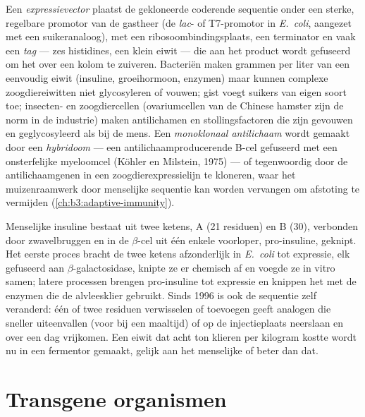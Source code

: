 \begin{definition}[Expressiesystemen]\label{def:b3:genetic-engineering:expression}
Een \emph{expressievector} plaatst de gekloneerde coderende sequentie
onder een sterke, regelbare promotor van de gastheer (de \emph{lac}- of
T7-promotor in \emph{E.~coli}, aangezet met een suikeranaloog), met een
ribosoombindingsplaats, een terminator en vaak een \emph{tag} --- zes
histidines, een klein eiwit --- die aan het product wordt gefuseerd om
het over een kolom te zuiveren. Bacteriën maken grammen per liter van
een eenvoudig eiwit (insuline, groeihormoon, enzymen) maar kunnen
complexe zoogdiereiwitten niet glycosyleren of vouwen; gist voegt
suikers van eigen soort toe; insecten- en zoogdiercellen
(ovariumcellen van de Chinese hamster zijn de norm in de industrie)
maken antilichamen en stollingsfactoren die zijn gevouwen en
geglycosyleerd als bij de mens. Een \emph{monoklonaal antilichaam}
wordt gemaakt door een \emph{hybridoom} --- een antilichaamproducerende
B-cel gefuseerd met een onsterfelijke myeloomcel (Köhler en Milstein,
1975) --- of tegenwoordig door de antilichaamgenen in een
zoogdierexpressielijn te kloneren, waar het muizenraamwerk door
menselijke sequentie kan worden vervangen om afstoting te vermijden
(\cref{ch:b3:adaptive-immunity}).
\end{definition}

\begin{example}[Insuline]\label{ex:b3:genetic-engineering:insulin}
Menselijke insuline bestaat uit twee ketens, A (21 residuen) en B (30),
verbonden door zwavelbruggen en in de $\beta$-cel uit één enkele
voorloper, pro-insuline, geknipt. Het eerste proces bracht de twee
ketens afzonderlijk in \emph{E.~coli} tot expressie, elk gefuseerd aan
$\beta$-galactosidase, knipte ze er chemisch af en voegde ze in vitro
samen; latere processen brengen pro-insuline tot expressie en knippen
het met de enzymen die de alvleesklier gebruikt. Sinds 1996 is ook de
sequentie zelf veranderd: één of twee residuen verwisselen of
toevoegen geeft analogen die sneller uiteenvallen (voor bij een
maaltijd) of op de injectieplaats neerslaan en over een dag vrijkomen.
Een eiwit dat acht ton klieren per kilogram kostte wordt nu in een
fermentor gemaakt, gelijk aan het menselijke of beter dan dat.
\end{example}

\section{Transgene organismen}

